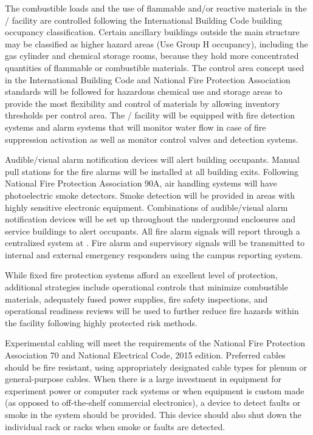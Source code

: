 The combustible loads and the use of flammable and/or reactive
materials in the / facility are controlled
following the International Building Code building occupancy
classification. Certain ancillary buildings outside the main structure
may be classified as higher hazard areas (Use Group H occupancy),
including the gas cylinder and chemical storage rooms, because they
hold more concentrated quantities of flammable or combustible
materials.  The control area concept used in the International
Building Code and National Fire Protection Association standards will
be followed for hazardous chemical use and storage areas to provide
the most flexibility and control of materials by allowing inventory
thresholds per control area.  The / facility
will be equipped with fire detection systems and alarm systems that
will monitor water flow in case of fire suppression activation as well
as monitor control valves and detection systems.

Audible/visual alarm notification devices will alert building
occupants.  Manual pull stations for the fire alarms will be installed
at all building exits.  Following National Fire Protection Association
90A, air handling systems will have photoelectric smoke detectors.
Smoke detection will be provided in areas with highly sensitive
electronic equipment.  Combinations of audible/visual alarm
notification devices will be set up throughout the underground
enclosures and service buildings to alert occupants. All fire alarm
signals will report through a centralized system at .
Fire alarm and supervisory signals will be transmitted to internal and
external emergency responders using the campus reporting system.

While fixed fire protection systems afford an excellent level
of protection, additional strategies include operational controls
that minimize combustible materials, adequately
fused power supplies, fire safety inspections, and operational
readiness reviews will be used to further reduce fire hazards
within the facility following  highly protected risk methods.

Experimental cabling will meet the requirements of the National Fire
Protection Association 70 and National Electrical Code, 2015 edition.
Preferred cables should be fire resistant, using appropriately
designated cable types for plenum or general-purpose cables.  When
there is a large investment in equipment for experiment power or
computer rack systems or when equipment is custom made (as opposed to
off-the-shelf commercial electronics), a device to detect faults or
smoke in the system should be provided.  This device should also shut
down the individual rack or racks when smoke or faults are detected.


